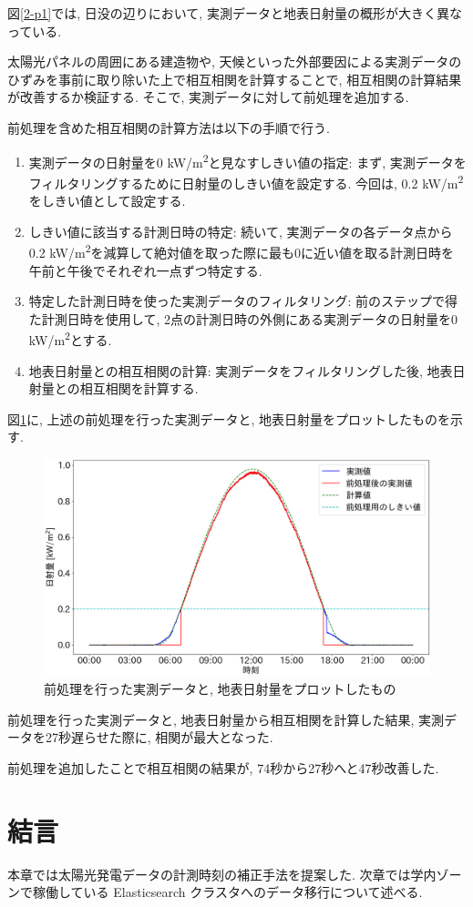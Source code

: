 図\ref{2-p1}では, 日没の辺りにおいて, 実測データと地表日射量の概形が大きく異なっている.

太陽光パネルの周囲にある建造物や, 天候といった外部要因による実測データのひずみを事前に取り除いた上で相互相関を計算することで, 相互相関の計算結果が改善するか検証する. そこで, 実測データに対して前処理を追加する.

前処理を含めた相互相関の計算方法は以下の手順で行う.

\begin{enumerate}
  \item 実測データの日射量を0 \si{\kilo\watt}/\si{\metre\squared}と見なすしきい値の指定: まず, 実測データをフィルタリングするために日射量のしきい値を設定する. 今回は, 0.2 \si{\kilo\watt}/\si{\metre\squared}をしきい値として設定する.
  \item しきい値に該当する計測日時の特定: 続いて, 実測データの各データ点から0.2 \si{\kilo\watt}/\si{\metre\squared}を減算して絶対値を取った際に最も0に近い値を取る計測日時を午前と午後でそれぞれ一点ずつ特定する.
  \item 特定した計測日時を使った実測データのフィルタリング: 前のステップで得た計測日時を使用して, 2点の計測日時の外側にある実測データの日射量を0 \si{\kilo\watt}/\si{\metre\squared}とする.
  \item 地表日射量との相互相関の計算: 実測データをフィルタリングした後, 地表日射量との相互相関を計算する.
\end{enumerate}

図\ref{2-p2}に, 上述の前処理を行った実測データと, 地表日射量をプロットしたものを示す.

\begin{figure}[H]
  \begin{center}
    \includegraphics[width=140mm]{sotu/figure/2/drop-under-0.2-q.png}
    \caption{前処理を行った実測データと, 地表日射量をプロットしたもの}
    \label{2-p2}
  \end{center}
\end{figure}

前処理を行った実測データと, 地表日射量から相互相関を計算した結果, 実測データを27秒遅らせた際に, 相関が最大となった.

前処理を追加したことで相互相関の結果が, 74秒から27秒へと47秒改善した.

\section{結言}
本章では太陽光発電データの計測時刻の補正手法を提案した.
次章では学内ゾーンで稼働している Elasticsearch クラスタへのデータ移行について述べる.